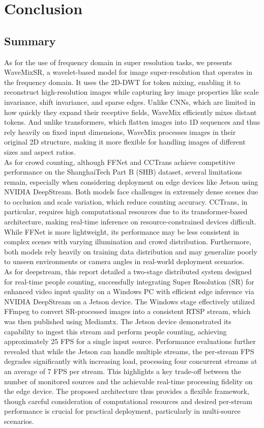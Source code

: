 \chapter{Conclusion}

\section{Summary}
As for the use of frequency domain in super resolution tasks, we presents WaveMixSR, a wavelet-based model for image super-resolution that operates in the frequency domain. It uses the 2D-DWT for token mixing, enabling it to reconstruct high-resolution images while capturing key image properties like scale invariance, shift invariance, and sparse edges. Unlike CNNs, which are limited in how quickly they expand their receptive fields, WaveMix efficiently mixes distant tokens. And unlike transformers, which flatten images into 1D sequences and thus rely heavily on fixed input dimensions, WaveMix processes images in their original 2D structure, making it more flexible for handling images of different sizes and aspect ratios.\\
As for crowd counting, although FFNet and CCTrans achieve competitive performance on the ShanghaiTech Part B (SHB) dataset, several limitations remain, especially when considering deployment on edge devices like Jetson using NVIDIA DeepStream. Both models face challenges in extremely dense scenes due to occlusion and scale variation, which reduce counting accuracy. CCTrans, in particular, requires high computational resources due to its transformer-based architecture, making real-time inference on resource-constrained devices difficult. While FFNet is more lightweight, its performance may be less consistent in complex scenes with varying illumination and crowd distribution. Furthermore, both models rely heavily on training data distribution and may generalize poorly to unseen environments or camera angles in real-world deployment scenarios.\\
As for deepstream, this report detailed a two-stage distributed system designed for real-time people counting, successfully integrating Super Resolution (SR) for enhanced video input quality on a Windows PC with efficient edge inference via NVIDIA DeepStream on a Jetson device. The Windows stage effectively utilized FFmpeg to convert SR-processed images into a consistent RTSP stream, which was then published using Mediamtx. The Jetson device demonstrated its capability to ingest this stream and perform people counting, achieving approximately 25 FPS for a single input source. Performance evaluations further revealed that while the Jetson can handle multiple streams, the per-stream FPS degrades significantly with increasing load, processing four concurrent streams at an average of 7 FPS per stream. This highlights a key trade-off between the number of monitored sources and the achievable real-time processing fidelity on the edge device. The proposed architecture thus provides a flexible framework, though careful consideration of computational resources and desired per-stream performance is crucial for practical deployment, particularly in multi-source scenarios.

